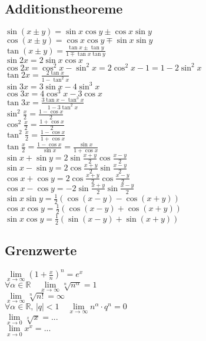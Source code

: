 \documentclass[10pt]{article}
\begin{document}
\subsection{Additionstheoreme}
$\sin(x\pm y)=\sin x\cos y\pm\cos x\sin y$\\
$\cos(x\pm y)=\cos x\cos y\mp\sin x\sin y$\\
$\tan(x\pm y)=\frac{\tan x\pm\tan y}{1\mp\tan x\tan y}$\\
$\sin 2x=2\sin x\cos x$\\
$\cos 2x=\cos^2x-\sin^2x=2\cos^2x-1=1-2\sin^2x$\\
$\tan 2x=\frac{2\tan x}{1-\tan^2x}$\\
$\sin 3x=3\sin x-4\sin^3x$\\
$\cos 3x=4\cos^3x-3\cos x$\\
$\tan 3x=\frac{3\tan x-\tan^3x}{1-3\tan^2 x}$\\
$\sin^2\frac{x}{2}=\frac{1-\cos x}{2}$\\
$\cos^2\frac{x}{2}=\frac{1+\cos x}{2}$\\
$\tan^2\frac{x}{2}=\frac{1-\cos x}{1+\cos x}$\\
$\tan\frac{x}{2}=\frac{1-\cos x}{\sin x}=\frac{\sin x}{1+\cos x}$\\
$\sin x+\sin y=2\sin\frac{x+y}{2}\cos\frac{x-y}{2}$\\
$\sin x-\sin y=2\cos\frac{x+y}{2}\sin\frac{x-y}{2}$\\
$\cos x+\cos y=2\cos\frac{x+y}{2}\cos\frac{x-y}{2}$\\
$\cos x-\cos y=-2\sin\frac{x+y}{2}\sin\frac{x-y}{2}$\\
$\sin x\sin y=\frac{1}{2}(\cos(x-y)-\cos(x+y))$\\
$\cos x\cos y=\frac{1}{2}(\cos(x-y)+\cos(x+y))$\\
$\sin x\cos y=\frac{1}{2}(\sin(x-y)+\sin(x+y))$\\

\subsection{Grenzwerte}
$\lim\limits_{x\to\infty}(1+\frac{x}{n})^n=e^x$\\
$\forall\alpha\in\mathbb{R}\quad\lim\limits_{x\to\infty}\sqrt[n]{n^\alpha}=1$\\
$\lim\limits_{x\to\infty}\sqrt[n]{n!}=\infty$\\
$\forall\alpha\in\mathbb{R},\,|q|<1\quad\lim\limits_{x\to\infty}n^\alpha\cdot q^n=0$\\
$\lim\limits_{x\to0}\sqrt[x]x=...$\\
$\lim\limits_{x\to0}x^x=...$\\
\end{document}

